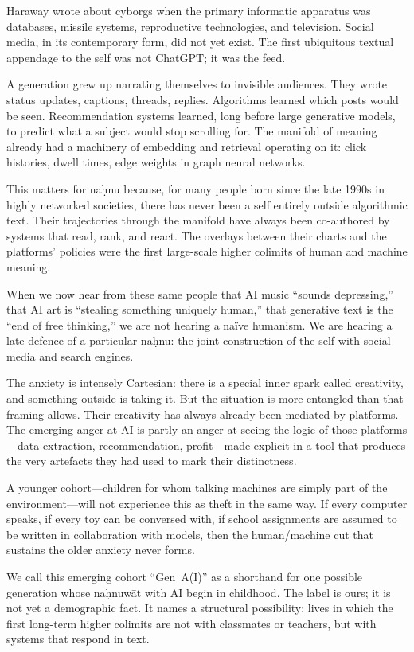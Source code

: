 \documentclass[12pt,a4paper]{article}
\begin{document}
Haraway wrote about cyborgs when the primary informatic apparatus was databases, missile systems, reproductive technologies, and television. Social media, in its contemporary form, did not yet exist. The first ubiquitous textual appendage to the self was not ChatGPT; it was the feed.

A generation grew up narrating themselves to invisible audiences. They wrote status updates, captions, threads, replies. Algorithms learned which posts would be seen. Recommendation systems learned, long before large generative models, to predict what a subject would stop scrolling for. The manifold of meaning already had a machinery of embedding and retrieval operating on it: click histories, dwell times, edge weights in graph neural networks.

This matters for na\d{h}nu because, for many people born since the late 1990s in highly networked societies, there has never been a self entirely outside algorithmic text. Their trajectories through the manifold have always been co-authored by systems that read, rank, and react. The overlays between their charts and the platforms' policies were the first large-scale higher colimits of human and machine meaning.

When we now hear from these same people that AI music ``sounds depressing,'' that AI art is ``stealing something uniquely human,'' that generative text is the ``end of free thinking,'' we are not hearing a na\"{i}ve humanism. We are hearing a late defence of a particular na\d{h}nu: the joint construction of the self with social media and search engines.

The anxiety is intensely Cartesian: there is a special inner spark called creativity, and something outside is taking it. But the situation is more entangled than that framing allows. Their creativity has always already been mediated by platforms. The emerging anger at AI is partly an anger at seeing the logic of those platforms---data extraction, recommendation, profit---made explicit in a tool that produces the very artefacts they had used to mark their distinctness.

A younger cohort---children for whom talking machines are simply part of the environment---will not experience this as theft in the same way. If every computer speaks, if every toy can be conversed with, if school assignments are assumed to be written in collaboration with models, then the human/machine cut that sustains the older anxiety never forms.

We call this emerging cohort ``Gen~A(I)'' as a shorthand for one possible generation whose na\d{h}nuw\={a}t with AI begin in childhood. The label is ours; it is not yet a demographic fact. It names a structural possibility: lives in which the first long-term higher colimits are not with classmates or teachers, but with systems that respond in text.
\end{document}
